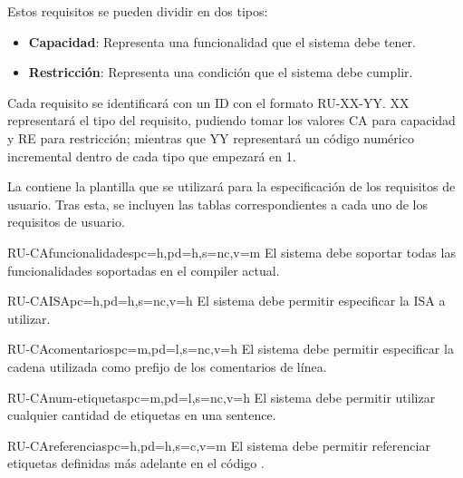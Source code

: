 \noindent
Estos requisitos se pueden dividir en dos tipos:

\begin{itemize}
    \item \textbf{Capacidad}: Representa una funcionalidad que el sistema debe tener.
    \item \textbf{Restricción}: Representa una condición que el sistema debe cumplir.
\end{itemize}

Cada requisito se identificará con un ID con el formato RU-XX-YY. XX
representará el tipo del requisito, pudiendo tomar los valores CA para capacidad
y RE para restricción; mientras que YY representará un código numérico incremental
dentro de cada tipo que empezará en 1.

La  contiene la plantilla que se utilizará para la
especificación de los requisitos de usuario. Tras esta, se incluyen las tablas
correspondientes a cada uno de los requisitos de usuario.



\begin{userReq}{RU-CA}{funcionalidades}{pc=h,pd=h,s=nc,v=m}
    El sistema debe soportar todas las funcionalidades soportadas en el
    \gls{compiler} actual.
\end{userReq}

\begin{userReq}{RU-CA}{ISA}{pc=h,pd=h,s=nc,v=h}
    El sistema debe permitir especificar la \gls{ISA} a utilizar.
\end{userReq}

\begin{userReq}{RU-CA}{comentarios}{pc=m,pd=l,s=nc,v=h}
    El sistema debe permitir especificar la cadena utilizada como prefijo de los
    comentarios de línea.
\end{userReq}

\begin{userReq}{RU-CA}{num-etiquetas}{pc=m,pd=l,s=nc,v=h}
    El sistema debe permitir utilizar cualquier cantidad de etiquetas en una
    \gls{sentence}.
\end{userReq}

\begin{userReq}{RU-CA}{referencias}{pc=h,pd=h,s=c,v=m}
    El sistema debe permitir referenciar etiquetas definidas más adelante en el
    código .
\end{userReq}


